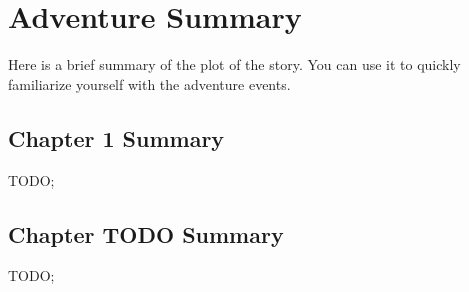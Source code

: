\section{Adventure Summary}

Here is a brief summary of the plot of the story. You can use it to quickly familiarize yourself with the adventure events.



\subsection{Chapter 1 Summary}

TODO; \lipsum[1][1-2]

\subsection{Chapter TODO Summary}

TODO; \lipsum[1][1-2]